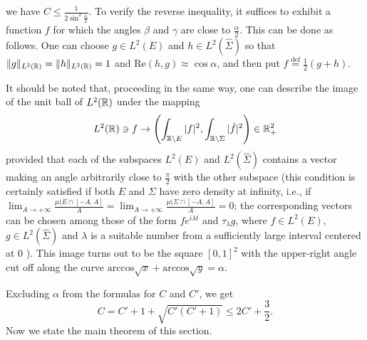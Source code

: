   we have $C\le \frac{1}{2\sin^2 \frac{\alpha}{2}}$. To verify the reverse inequality, it suffices to exhibit a function $f$ for which the angles $\beta$ and $\gamma$ are close to $\frac{\alpha}{2}$. This can be done as follows. One can choose $g\in L^2(E)$ and $h\in L^2(\hat{\Sigma})$ so that $\|g\|_{L^2(\mathbb{R})}=\|h\|_{L^2(\mathbb{R})}=1$ and $\mathrm{Re}(h,g)\approx \cos\alpha$, and then put $f\overset{\mathrm{def}}{=}\frac{1}{2}(g+h)$.

  It should be noted that, proceeding in the same way, one can describe the image of the unit ball of $L^2(\mathbb{R})$ under the mapping
  \[
    L^2(\mathbb{R})\ni f\to \left( \int_{\mathbb{R}\backslash E}|f|^2,\int_{\mathbb{R}\backslash \Sigma}|\hat{f}|^2 \right) \in \mathbb{R}^2_{+}
  \] 
  provided that each of the subspaces $L^2(E)$ and $L^2(\hat{\Sigma})$ contains a vector making an angle arbitrarily close to $\frac{\pi}{2}$ with the other subspace (this condition is certainly satisfied if both $E$ and $\Sigma$ have zero density at infinity, i.e., if $\lim_{A \to +\infty}  \frac{\mu(E\cap [-A,A]}{A}=\lim_{A \to +\infty} \frac{\mu(\Sigma\cap [-A,A]}{A}=0$; the corresponding vectors can be chosen among those of the form $fe^{i\lambda t}$ and $\tau_{\lambda}g$, where $f\in L^2(E)$, $g\in L^2(\hat{\Sigma})$ and $\lambda$ is a suitable number from a sufficiently large interval centered at $0$ ). This image turns out to be the square $[0,1]^2$ with the upper-right angle cut off along the curve $\mathrm{arccos}\sqrt{x} +\mathrm{arccos}\sqrt{y} =\alpha$.

  Excluding $\alpha$ from the formulas for $C$ and $C'$, we get 
  \[
    C=C'+1+\sqrt{C'(C'+1)} \le 2C'+\frac{3}{2}.
  \] 
Now we state the main theorem of this section.

